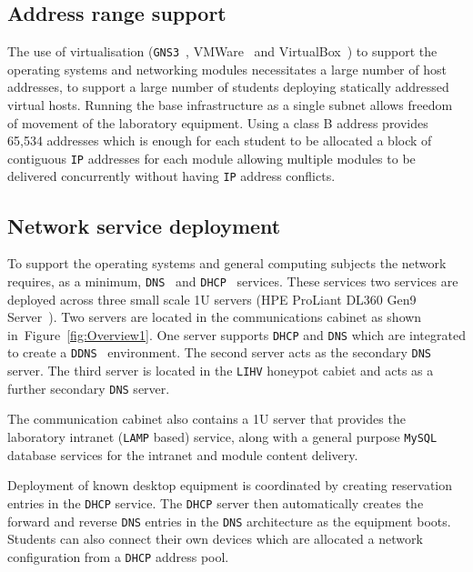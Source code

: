 \subsection{Address range support}
The use of virtualisation (\texttt{GNS3}~\cite{GNS3:17}, VMWare~\cite{VMWARE:17} and VirtualBox~\cite{O:17}) to support the operating systems and networking modules necessitates a large number of host addresses, to support a large number of students deploying statically addressed virtual hosts. Running the base infrastructure as a single subnet allows freedom of movement of the laboratory equipment. Using a class B address provides 65,534 addresses which is enough for each student to be allocated a block of contiguous \texttt{IP} addresses for each module allowing multiple modules to be delivered concurrently without having \texttt{IP} address conflicts. 

\subsection{Network service deployment}\label{InfraService}
To support the operating systems and general computing subjects the network requires, as a minimum, \texttt{DNS}~\cite{RA:11} and \texttt{DHCP}~\cite{DL:02} services. These services two services are deployed across three small scale 1U servers (HPE ProLiant DL360 Gen9 Server~\cite{HPE:17}). Two servers are located in the communications cabinet as shown in~Figure~\ref{fig:Overview1}. One server supports \texttt{DHCP} and \texttt{DNS} which are integrated to create a \texttt{DDNS}~\cite{SV:06} environment. The second server acts as the secondary \texttt{DNS} server. The third server is located in the \texttt{LIHV} honeypot cabiet and acts as a further secondary \texttt{DNS} server. 

The communication cabinet also contains a 1U server that provides the laboratory intranet (\texttt{LAMP} based) service, along with a general purpose \texttt{MySQL} database services for the intranet and module content delivery. 

Deployment of known desktop equipment is coordinated by creating reservation entries in the \texttt{DHCP} service. The \texttt{DHCP} server then automatically creates the forward and reverse \texttt{DNS} entries in the \texttt{DNS} architecture as the equipment boots. Students can also connect their own devices which are allocated a network configuration from a \texttt{DHCP} address pool. 

